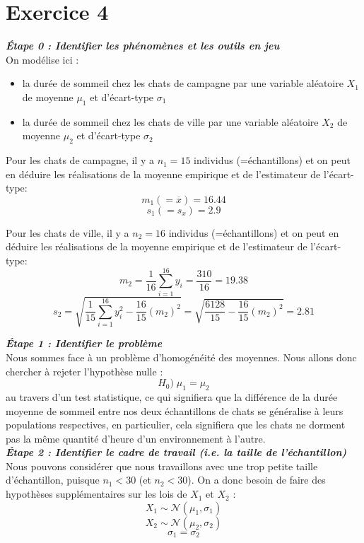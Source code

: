 \documentclass[a4paper,oneside,12pt]{article}
\theoremstyle{plain}
\begin{document}
\section*{Exercice 4}


\textit{\textbf{Étape 0 : Identifier les phénomènes et les outils en jeu}}\\
On modélise ici :
\begin{itemize}
    \item la durée de sommeil chez les chats de campagne par une variable aléatoire $X_1$ de moyenne $\mu_1$ et d'écart-type $\sigma_1$
    \item la durée de sommeil chez les chats de ville par une variable aléatoire $X_2$ de moyenne $\mu_2$ et d'écart-type $\sigma_2$
\end{itemize}
    
Pour les chats de campagne, il y a $n_1 = 15$ individus (=échantillons) et on peut en déduire les réalisations de la moyenne empirique et de l'estimateur de l'écart-type:
$$m_1 (=\overline{x}) = 16.44$$
$$s_1 (=s_x) = 2.9$$
    
Pour les chats de ville, il y a $n_2 = 16$ individus (=échantillons) et on peut en déduire les réalisations de la moyenne empirique et de l'estimateur de l'écart-type:
$$m_2  = \frac{1}{16}\sum_{i=1}^{16}y_i = \frac{310}{16} = 19.38$$
$$s_2 =\sqrt{\frac{1}{15}\sum_{i=1}^{16}y_i^2 - \frac{16}{15}(m_2)^2} = \sqrt{\frac{6128}{15} - \frac{16}{15}(m_2)^2} = 2.81$$
    
\textit{\textbf{Étape 1 : Identifier le problème}}\\
Nous sommes face à un problème d'homogénéité des moyennes. Nous allons donc chercher à rejeter l'hypothèse nulle :
$$H_0) \;\mu_1=\mu_2$$ 
au travers d'un test statistique, ce qui signifiera que la différence de la durée moyenne de sommeil entre nos deux échantillons de chats se généralise à leurs populations respectives, en particulier, cela signifiera que les chats ne dorment pas la même quantité d'heure d'un environnement à l'autre.\\
    
\textit{\textbf{Étape 2 : Identifier le cadre de travail (i.e. la taille de l'échantillon)}}\\
Nous pouvons considérer que nous travaillons avec une trop petite taille d'échantillon, puisque $n_1<30$ (et $n_2<30$). On a donc besoin de faire des hypothèses supplémentaires sur les lois de $X_1$ et $X_{2}$ :
$$X_1 \sim \mathcal{N}(\mu_1, \sigma_1)$$
$$X_2 \sim \mathcal{N}(\mu_2, \sigma_2)$$
$$\sigma_1 = \sigma_2$$
\end{document}
